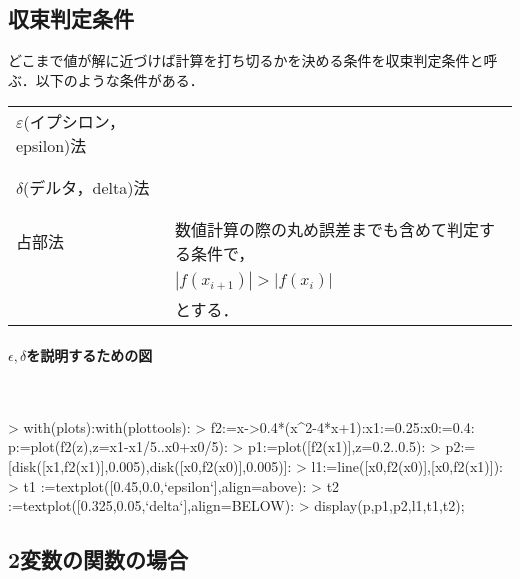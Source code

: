 \subsection{収束判定条件}
どこまで値が解に近づけば計算を打ち切るかを決める条件を収束判定条件と呼ぶ．以下のような条件がある．

\begin{table}[h]\begin{center}\begin{tabular}{|l|l|}
\hline
$\varepsilon$(イプシロン，epsilon)法 & \hspace{100mm} \\ 
&\\
&\\
\hline
$\delta$(デルタ，delta)法 & \hspace{100mm} \\ 
&\\
&\\
\hline
占部法 & 数値計算の際の丸め誤差までも含めて判定する条件で，\\
& $\left|f(x_{i+1})\right| > \left|f(x_i)\right|$ \\
&とする． \\ 
\hline
\end{tabular}\end{center}\end{table}%

\paragraph{$\epsilon, \delta$を説明するための図}　
\begin{MapleInput}
> with(plots):with(plottools):
> f2:=x->0.4*(x^2-4*x+1):x1:=0.25:x0:=0.4: p:=plot(f2(z),z=x1-x1/5..x0+x0/5):
> p1:=plot([f2(x1)],z=0.2..0.5): 
> p2:=[disk([x1,f2(x1)],0.005),disk([x0,f2(x0)],0.005)]: 
> l1:=line([x0,f2(x0)],[x0,f2(x1)]): 
> t1 :=textplot([0.45,0.0,`epsilon`],align=above): 
> t2 :=textplot([0.325,0.05,`delta`],align=BELOW):
> display(p,p1,p2,l1,t1,t2);
\end{MapleInput}

\subsection{2変数の関数の場合}

